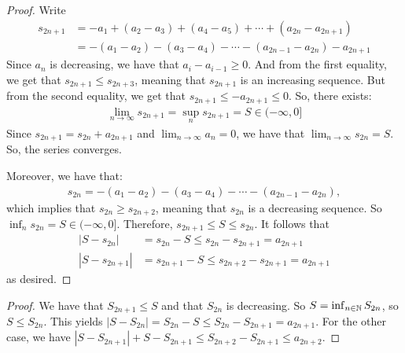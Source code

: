 \documentclass{report}
\begin{document}
\begin{proof}
    Write
    \begin{align*}
        s_{2n + 1} &= -a_1 + (a_2 - a_3) + (a_4 - a_5) + \cdots + (a_{2n} - a_{2n + 1}) \\
        &= -(a_1 - a_2) - (a_3 - a_4) - \cdots - (a_{2n-1} - a_{2n}) - a_{2n+1} 
    \end{align*}
    Since $a_n$ is decreasing, we have that $a_i - a_{i-1} \geq 0$. And from the first equality, we get that $s_{2n+1} \leq s_{2n+3}$, meaning that $s_{2n + 1}$ is an increasing sequence. But from the second equality, we get that $s_{2n+1} \leq -a_{2n+1} \leq 0$. So, there exists:
    \begin{align*}
        \lim_{n \to \infty} s_{2n+1} = \sup_n s_{2n+1} = S \in (-\infty, 0]
    \end{align*}
    Since $s_{2n+1} = s_{2n} + a_{2n+1}$ and $\lim_{n\to\infty} a_n = 0$, we have that $\lim_{n\to\infty} s_{2n} = S$. So, the series converges.

    Moreover, we have that: 
    \begin{align*}
        s_{2n} = -(a_1 - a_2) - (a_3 - a_4) - \cdots - (a_{2n-1} - a_{2n}),
        \end{align*}
        which implies that $s_{2n} \geq s_{2n+2}$, meaning that $s_{2n}$ is a decreasing sequence. So $\inf_n s_{2n} = S \in (-\infty, 0]$. Therefore, $s_{2n+1} \leq S \leq s_{2n}$. It follows that
        \begin{align*}
            |S - s_{2n}| &= s_{2n} - S \leq s_{2n} - s_{2n+1} = a_{2n+1} \\
            |S - s_{2n+1}| &= s_{2n+1} - S \leq s_{2n+2} - s_{2n+1} = a_{2n+1}
        \end{align*}
        as desired.
\end{proof}
\begin{proof}
    We have that $S_{2n + 1} \leq S$ and that $S_{2n}$ is decreasing. So $S = \inf_{n \in \NN} S_{2n}$, so $S \leq S_{2n}$. This yields $|S - S_{2n} | = S_{2n} - S \leq S_{2n} - S_{2n + 1} = a_{2n + 1}$. For the other case, we have $|S - S_{2n+1}| + S - S_{2n+1} \leq S_{2n+2} - S_{2n + 1} \leq a_{2n+2}$.
\end{proof}
\end{document}
